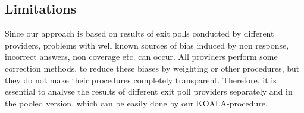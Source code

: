 \documentclass[smallcondensed]{svjour3}     %
\begin{document}
\subsection{Limitations}
Since our approach is based on results of exit polls conducted by different providers, problems with well known sources of bias induced by non response, incorrect answers, non coverage etc. can occur. All providers perform  some correction methods, to reduce  these biases by weighting or other procedures, but they do not make their procedures completely transparent. Therefore, it is essential to analyse the results of different exit poll providers separately and in the pooled version, which can be easily done by our KOALA-procedure.      
%


\end{document}
